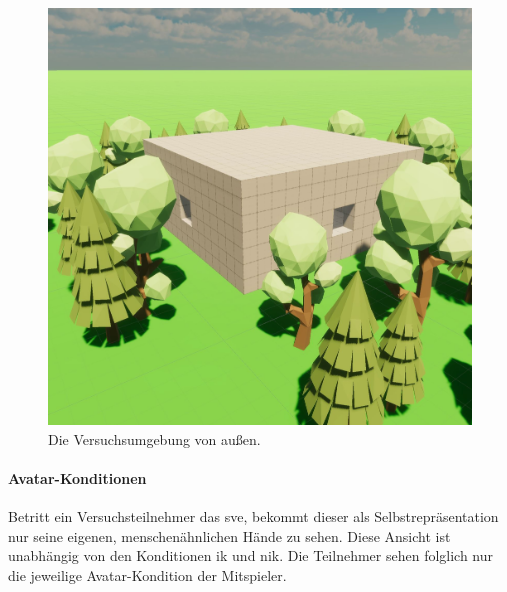 \documentclass[a4paper,11pt]{article}%
\renewcommand{\\}{\vspace*{0.5\baselineskip} \newline}
\begin{document}
\begin{figure}[H]
		\begin{footnotesize}
		\centering
			\includegraphics[scale=0.4]{Abbildungen/Versuchsumgebung/Raum.JPG}
			\caption[Die Versuchsumgebung von außen]{Die Versuchsumgebung von außen.}
			\label{Versuchsumgebung}
		\end{footnotesize}
	\end{figure}

\paragraph{Avatar-Konditionen}
Betritt ein Versuchsteilnehmer das \ac{sve}, bekommt dieser als Selbstrepräsentation nur seine eigenen, menschenähnlichen Hände zu sehen. Diese Ansicht ist unabhängig von den Konditionen \ac{ik} und \ac{nik}. Die Teilnehmer sehen folglich nur die jeweilige Avatar-Kondition der Mitspieler. 
\end{document}
